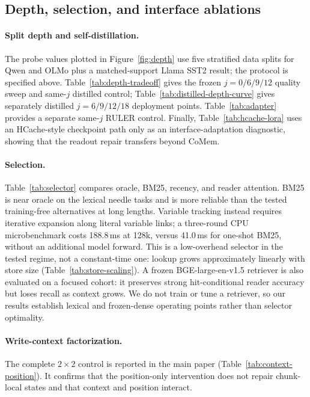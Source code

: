 \subsection{Depth, selection, and interface ablations}
\label{app:ablations}

\paragraph{Split depth and self-distillation.}
The probe values plotted in Figure~\ref{fig:depth} use five stratified data
splits for Qwen and OLMo plus a matched-support Llama SST2 result; the protocol
is specified above. Table~\ref{tab:depth-tradeoff} gives the frozen
$j=0/6/9/12$ quality sweep and same-$j$ distilled control;
Table~\ref{tab:distilled-depth-curve} gives separately distilled
$j=6/9/12/18$ deployment points. Table~\ref{tab:adapter} provides a separate
same-$j$ RULER control.
Finally, Table~\ref{tab:hcache-lora} uses an HCache-style checkpoint path only
as an interface-adaptation diagnostic, showing that the readout repair transfers
beyond CoMem.





\paragraph{Selection.}
Table~\ref{tab:selector} compares oracle, BM25, recency, and reader attention.
BM25 is near oracle on the lexical needle tasks and is more reliable than the
tested training-free alternatives at long lengths. Variable tracking instead
requires iterative expansion along literal variable links; a three-round CPU
microbenchmark costs 188.8\,ms at 128k, versus 41.0\,ms for one-shot BM25, without
an additional model forward. This is a low-overhead selector in the tested
regime, not a constant-time one: lookup grows approximately linearly with store
size (Table~\ref{tab:store-scaling}). A frozen BGE-large-en-v1.5 retriever is
also evaluated on a focused cohort: it preserves strong hit-conditional reader
accuracy but loses recall as context grows. We do not train or tune a retriever,
so our results establish lexical and frozen-dense operating points rather than
selector optimality.



\paragraph{Write-context factorization.}
The complete $2{\times}2$ control is reported in the main paper
(Table~\ref{tab:context-position}). It confirms that the position-only
intervention does not repair chunk-local states and that context and position
interact.

